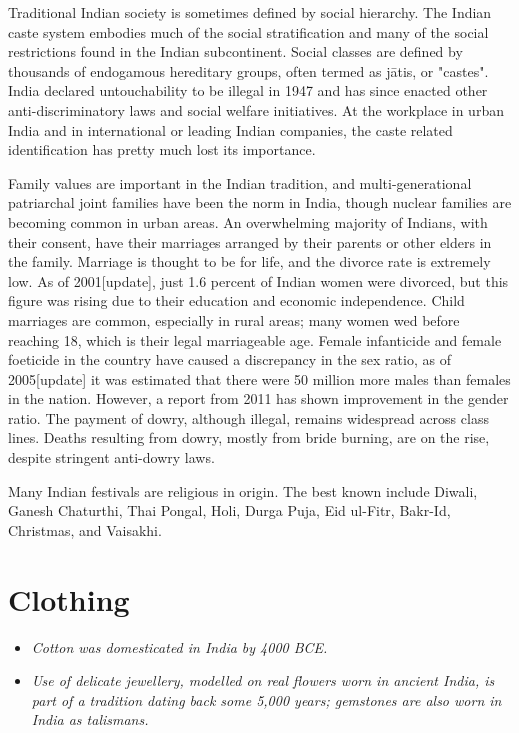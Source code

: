 Traditional Indian society is sometimes defined by social hierarchy. The
Indian caste system embodies much of the social stratification and many
of the social restrictions found in the Indian subcontinent. Social
classes are defined by thousands of endogamous hereditary groups, often
termed as jātis, or "castes". India declared untouchability to be
illegal in 1947 and has since enacted other anti-discriminatory laws and
social welfare initiatives. At the workplace in urban India and in
international or leading Indian companies, the caste related
identification has pretty much lost its importance.

Family values are important in the Indian tradition, and
multi-generational patriarchal joint families have been the norm in
India, though nuclear families are becoming common in urban areas. An
overwhelming majority of Indians, with their consent, have their
marriages arranged by their parents or other elders in the family.
Marriage is thought to be for life, and the divorce rate is extremely
low. As of 2001{[}update{]}, just 1.6 percent of Indian women were
divorced, but this figure was rising due to their education and economic
independence. Child marriages are common, especially in rural areas;
many women wed before reaching 18, which is their legal marriageable
age. Female infanticide and female foeticide in the country have caused
a discrepancy in the sex ratio, as of 2005{[}update{]} it was estimated
that there were 50 million more males than females in the nation.
However, a report from 2011 has shown improvement in the gender ratio.
The payment of dowry, although illegal, remains widespread across class
lines. Deaths resulting from dowry, mostly from bride burning, are on
the rise, despite stringent anti-dowry laws.

Many Indian festivals are religious in origin. The best known include
Diwali, Ganesh Chaturthi, Thai Pongal, Holi, Durga Puja, Eid ul-Fitr,
Bakr-Id, Christmas, and Vaisakhi.

\section{Clothing}\label{clothing}

\begin{itemize}
\item
  \emph{Cotton was domesticated in India by 4000 BCE.}
\item
  \emph{Use of delicate jewellery, modelled on real flowers worn in
  ancient India, is part of a tradition dating back some 5,000 years;
  gemstones are also worn in India as talismans.}
\end{itemize}

